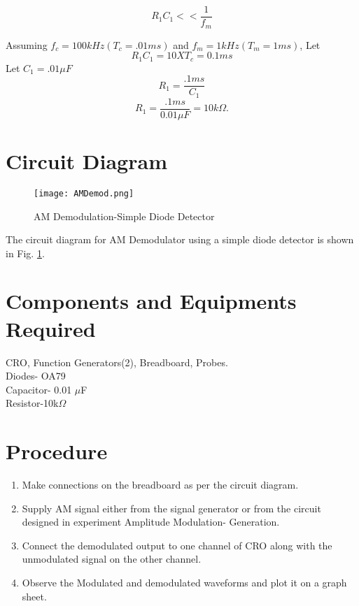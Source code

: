 \begin{equation}
R_1C_1<< \frac{1}{f_m}
\end{equation}

\noindent Assuming $f_c=100 kHz(T_c=.01ms)$ and $f_m=1kHz(T_m=1 ms)$,
Let 
\begin{equation}
R_1C_1 = 10 X T_c =0.1 ms
\end{equation}
\noindent Let $C_1=.01\mu F$
\begin{equation}
R_1 = \frac{.1ms}{C_1} 
\end{equation}
\begin{equation}
R_1 = \frac{.1ms}{0.01\mu F}=10 k\Omega. 
\end{equation}
\section*{Circuit Diagram}

\begin{figure}[h]
\texttt{[image: AMDemod.png]}
\caption{AM Demodulation-Simple Diode Detector}
\label{AMDemod} 
\end{figure}
The circuit diagram for AM Demodulator using a simple diode detector is shown in Fig. \ref{AMDemod}.

\section*{Components and Equipments Required}
CRO, Function Generators(2), Breadboard, Probes.
\\Diodes- OA79
\\Capacitor- 0.01 $\mu$F
\\Resistor-10k$\Omega$
\section*{Procedure}

\begin{enumerate}
\item
Make connections on the breadboard as per the circuit diagram.
\item
Supply AM signal either from the signal generator or from the circuit designed in experiment Amplitude Modulation- Generation. 
\item
Connect the demodulated output to one channel of CRO along with the unmodulated signal on the other channel.
\item
Observe the Modulated and demodulated waveforms and plot it on a graph sheet.
\end{enumerate}
